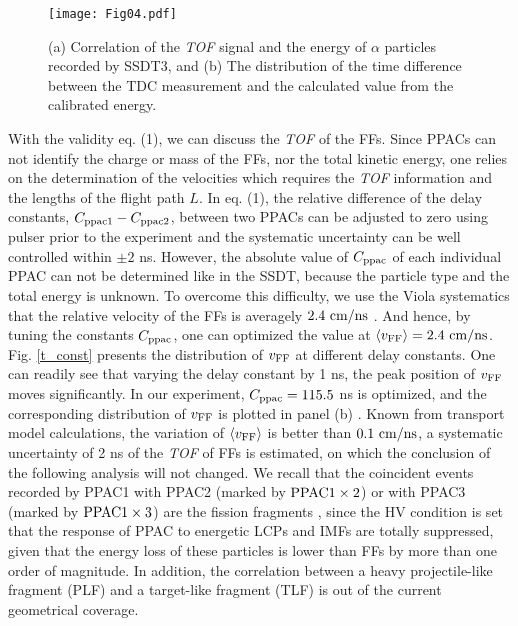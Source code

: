 \documentclass[submitting]{nst}
\begin{document}
\begin{figure}[!htb]
\texttt{[image: Fig04.pdf]}
\caption{(a) Correlation of the \textit{TOF} signal and the energy of $\alpha$ particles recorded by SSDT3, and (b) The distribution of the time difference between the TDC measurement  and the calculated value from the calibrated energy.}
\label{rf_check}
\end{figure}

With the validity eq. (1), we can discuss the  \textit{TOF} of the FFs.  Since PPACs can not identify the charge or mass of the FFs, nor the  total kinetic energy, one relies on the determination of the velocities which requires the \textit{TOF} information and the lengths of the flight path $L$.  In eq. (1),  the relative difference of the delay constants, $C_{\rm ppac1}-C_{\rm ppac2}$, between two PPACs can be adjusted to zero using pulser  prior to the experiment and the systematic uncertainty can be well controlled within  $\pm 2$ ns. However, the absolute value of $C_{\rm ppac}$ of each individual PPAC can not be determined like in the SSDT, because the particle type and the total energy is unknown. To overcome this difficulty, we use the Viola systematics that the relative velocity of the FFs is averagely $2.4 ~{\rm cm/ns}$ \cite{Viola} . And hence, by tuning the constants $C_{\rm ppac}$, one can  optimized the value at  $\left<v_{\rm FF}\right>=2.4 ~{\rm cm/ns}$.  Fig.  \ref{t_const} presents the distribution of  $v_{\rm FF}$  at different delay constants. One can readily see that varying the delay constant by 1 ns, the peak position of  $v_{\rm FF}$ moves significantly.  In our experiment, $C_{\rm ppac}=115.5$ ns is optimized, and the corresponding distribution of $v_{\rm FF}$  is plotted in panel (b) . Known from transport model calculations, the variation of $\left<v_{\rm FF}\right>$ is better than $0.1~{\rm cm/ns}$,    a systematic uncertainty of 2 ns of the \textit{TOF} of FFs is estimated, on which the conclusion of  the following analysis will not changed. We recall that  the coincident events recorded by  PPAC1 with PPAC2 (marked by ${\rm PPAC 1\times 2}$) or with PPAC3 (marked by ${\rm PPAC 1\times 3}$) are the fission fragments , since the HV condition  is set that the response of PPAC to energetic  LCPs and IMFs are totally suppressed, given that the energy loss of these particles is lower than FFs by more than one order of magnitude. In addition, the correlation between a heavy projectile-like fragment (PLF) and a target-like fragment (TLF) is out of the current geometrical coverage. 
\end{document}
